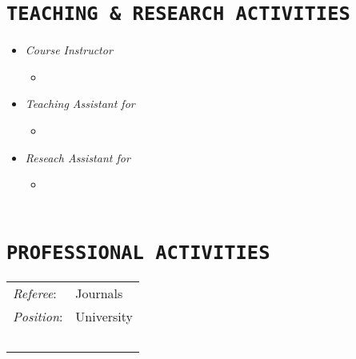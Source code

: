 \documentclass{cls/Curriculum_Vitae_Class}
\begin{document}
\section{\texttt{TEACHING \& RESEARCH ACTIVITIES}}
\begin{itemize}
	\item \textit{Course Instructor}
	\begin{itemize}
		\item[] 
	\end{itemize}
	\item \textit{Teaching Assistant for}
	\begin{itemize}
		\item[] 
	\end{itemize}
	\item \textit{Reseach Assistant for}
	\begin{itemize}
		\item[] \\~\\
	\end{itemize}
\end{itemize}


\section{\texttt{PROFESSIONAL ACTIVITIES}}
\begin{tabular}{ l l }
 \textit{Referee}: & Journals \\ [0.5em]
 \textit{Position}: & University \\~\\
\end{tabular}

\end{document}
